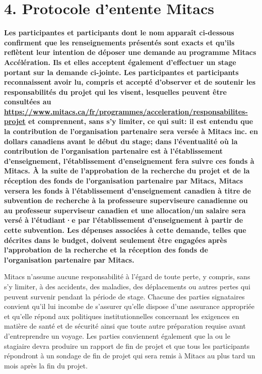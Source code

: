 \newcommand{\addul}[1]{\underline{#1}}
\titleformat{\section}{\centering\Large\bfseries}{\thesection}{1em}{\addul}
\section*{4. Protocole d'entente Mitacs}
{
\bfseries
Les participantes et participants dont le nom apparaît ci-dessous confirment que les renseignements présentés sont exacts et qu'ils reflètent leur intention de déposer une demande au programme Mitacs Accélération. Ils et elles acceptent également d'effectuer un stage portant sur la demande ci-jointe. Les participantes et participants reconnaissent avoir lu, compris et accepté d'observer et de soutenir les responsabilités du projet qui les visent, lesquelles peuvent être consultées au \url{https://www.mitacs.ca/fr/programmes/acceleration/responsabilites-projet} et comprennent, sans s'y limiter, ce qui suit: il est entendu que la contribution de l'organisation partenaire sera versée à Mitacs inc. en dollars canadiens avant le début du stage; dans l'éventualité où la contribution de l'organisation partenaire est à l'établissement d'enseignement, l'établissement d'enseignement fera suivre ces fonds à Mitacs. À la suite de l'approbation de la recherche du projet et de la réception des fonds de l'organisation partenaire par Mitacs, Mitacs versera les fonds à l'établissement d'enseignement canadien à titre de subvention de recherche à la professeure superviseure canadienne ou au professeur superviseur canadien et une allocation/un salaire sera versé à l'étudiant·e par l'établissement d'enseignement à partir de cette subvention. Les dépenses associées à cette demande, telles que décrites dans le budget, doivent seulement être engagées après l'approbation de la recherche et la réception des fonds de l'organisation partenaire par Mitacs.

Mitacs n'assume aucune responsabilité à l'égard de toute perte, y compris, sans s'y limiter, à des accidents, des maladies, des déplacements ou autres pertes qui peuvent survenir pendant la période de stage. Chacune des parties signataires convient qu'il lui incombe de s'assurer qu'elle dispose d'une assurance appropriée et qu'elle répond aux politiques institutionnelles concernant les exigences en matière de santé et de sécurité ainsi que toute autre préparation requise avant d'entreprendre un voyage. Les parties conviennent également que la ou le stagiaire devra produire un rapport de fin de projet et que tous les participants répondront à un sondage de fin de projet qui sera remis à Mitacs au plus tard un mois après la fin du projet.

}
